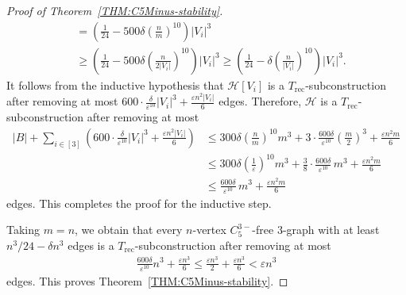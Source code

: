 \documentclass[11pt,a4paper]{article}
\theoremstyle{remark}
\begin{document}
\begin{proof}[Proof of Theorem~\ref{THM:C5Minus-stability}]
\begin{align*}
        & = \left(\frac{1}{24} - 500\delta \left(\frac{n}{m}\right)^{10}\right) |V_i|^3 \\
        & \ge \left(\frac{1}{24} - 500\delta \left(\frac{n}{2|V_i|}\right)^{10} \right) |V_i|^3 
         \ge \left(\frac{1}{24} - \delta \left(\frac{n}{|V_i|}\right)^{10}\right) |V_i|^3. 
    \end{align*}
    It follows from the inductive hypothesis that $\mathcal{H}[V_i]$ is a $T_{\mathrm{rec}}$-subconstruction after removing at most $600\cdot \frac{\delta}{\varepsilon^{10}} |V_i|^3+ \frac{\varepsilon n^2 |V_i|}{6}$ edges. 
    Therefore, $\mathcal{H}$ is a $T_{\mathrm{rec}}$-subconstruction after removing at most
    \begin{align*}
        |B| + \sum_{i\in [3]} \left(600 \cdot \frac{\delta}{\varepsilon^{10}} |V_i|^3+ \frac{\varepsilon n^2 |V_i|}{6}\right)
        & \le 300 \delta \left(\frac{n}{m}\right)^{10} m^3 + 3\cdot \frac{600\delta}{\varepsilon^{10}} \left(\frac{m}{2}\right)^3 + \frac{\varepsilon n^2 m}{6}  \\
        & \le  300 \delta \left(\frac{1}{\varepsilon}\right)^{10} m^3 + \frac{3}{8} \cdot \frac{600\delta}{\varepsilon^{10}}\, m^3  + \frac{\varepsilon n^2 m}{6}  \\
        & \le \frac{600 \delta}{\varepsilon^{10}}\, m^3 + \frac{\varepsilon n^2 m}{6}
    \end{align*}
    edges.
    This completes the proof for the inductive step. 
    
    Taking $m = n$, we obtain that every $n$-vertex $C_{5}^{3-}$-free $3$-graph with at least $n^3/24 - \delta n^3$ edges is a $T_{\mathrm{rec}}$-subconstruction after removing at most 
    \begin{align*}
        \frac{600 \delta}{\varepsilon^{10}} n^3 + \frac{\varepsilon n^3}{6} 
        \le \frac{\varepsilon n^3}{2} + \frac{\varepsilon n^3}{6} 
        < \varepsilon n^3
    \end{align*}
    edges.
    This proves Theorem~\ref{THM:C5Minus-stability}.
\end{proof}



\end{document}
